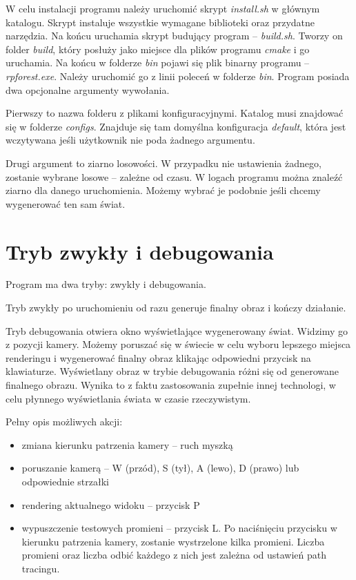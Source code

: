 \documentclass[inz,shortabstract]{iithesis}
\begin{document}
        
        W celu instalacji programu należy uruchomić skrypt \textit{install.sh} w głównym katalogu. Skrypt instaluje wszystkie wymagane biblioteki oraz przydatne narzędzia. Na końcu uruchamia skrypt budujący program -- \textit{build.sh}. Tworzy on folder \textit{build}, który posłuży jako miejsce dla plików programu \textit{cmake} i go uruchamia. Na końcu w folderze \textit{bin} pojawi się plik binarny programu -- \textit{rpforest.exe}. Należy uruchomić go z linii poleceń w folderze \textit{bin}. Program posiada dwa opcjonalne argumenty wywołania. 
        
        Pierwszy to nazwa folderu z plikami konfiguracyjnymi. Katalog musi znajdować się w folderze \textit{configs}. Znajduje się tam domyślna konfiguracja \textit{default}, która jest wczytywana jeśli użytkownik nie poda żadnego argumentu. 
        
        Drugi argument to ziarno losowości. W przypadku nie ustawienia żadnego, zostanie wybrane losowe -- zależne od czasu. W logach programu można znaleźć ziarno dla danego uruchomienia. Możemy wybrać je podobnie jeśli chcemy wygenerować ten sam świat. 
    
    \section{Tryb zwykły i debugowania}
        Program ma dwa tryby: zwykły i debugowania. 
        
        Tryb zwykły po uruchomieniu od razu generuje finalny obraz i kończy działanie. 
        
        Tryb debugowania otwiera okno wyświetlające wygenerowany świat. Widzimy go z pozycji kamery. Możemy poruszać się w świecie w celu wyboru lepszego miejsca renderingu i wygenerować finalny obraz klikając odpowiedni przycisk na klawiaturze. Wyświetlany obraz w trybie debugowania różni się od generowane finalnego obrazu. Wynika to z faktu zastosowania zupełnie innej technologi, w celu płynnego wyświetlania świata w czasie rzeczywistym.
        
        Pełny opis możliwych akcji:
        \begin{itemize}
            \item zmiana kierunku patrzenia kamery -- ruch myszką
            \item poruszanie kamerą -- W (przód), S (tył), A (lewo), D (prawo) lub odpowiednie strzałki
            \item rendering aktualnego widoku -- przycisk P
            \item wypuszczenie testowych promieni -- przycisk L. Po naciśnięciu przycisku w kierunku patrzenia kamery, zostanie wystrzelone kilka promieni. Liczba promieni oraz liczba odbić każdego z nich jest zależna od ustawień path tracingu.
        \end{itemize}
        
\end{document}
